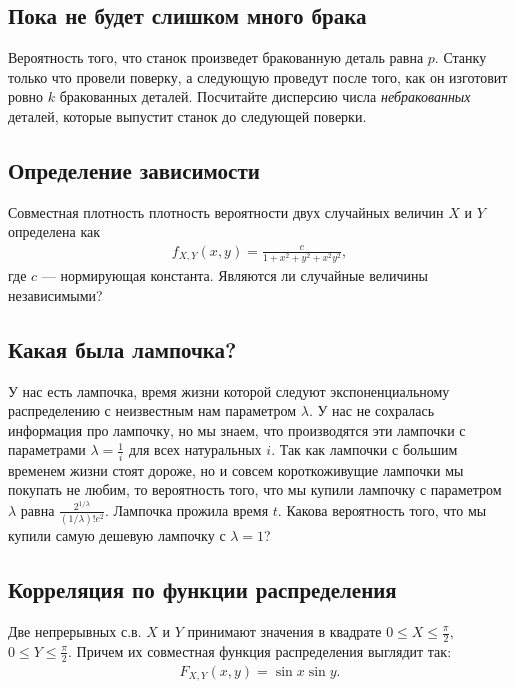 \documentclass[12pt]{article}
\begin{document}
\subsection{Пока не будет слишком много брака}

Вероятность того, что станок произведет бракованную деталь равна $p$. Станку только что провели поверку, а следующую проведут после того, как он изготовит ровно $k$ бракованных деталей. Посчитайте дисперсию числа \emph{небракованных} деталей, которые выпустит станок до следующей поверки.



\subsection{Определение зависимости}

Совместная плотность плотность вероятности двух случайных величин $X$ и $Y$ определена как
\begin{align*}
    f_{X, Y}(x, y) = \frac{c}{1 + x^2 + y^2 + x^2y^2},
\end{align*}
где $c$ --- нормирующая константа. Являются ли случайные величины независимыми?



\subsection{Какая была лампочка?}

У нас есть лампочка, время жизни которой следуют экспоненциальному распределению с неизвестным нам параметром $\lambda$. У нас не сохралась информация про лампочку, но мы знаем, что производятся эти лампочки с параметрами $\lambda = \frac{1}{i}$ для всех натуральных $i$. Так как лампочки с большим временем жизни стоят дороже, но и совсем короткоживущие лампочки мы покупать не любим, то вероятность того, что мы купили лампочку с параметром $\lambda$ равна $\frac{2^{1/\lambda}}{(1/\lambda)!e^2}$. Лампочка прожила время $t$. Какова вероятность того, что мы купили самую дешевую лампочку с $\lambda = 1$?




\subsection{Корреляция по функции распределения}

Две непрерывных с.в. $X$ и $Y$ принимают значения в квадрате $0 \le X \le \frac{\pi}{2},$ $0 \le Y \le \frac{\pi}{2}$. Причем их совместная функция распределения выглядит так:
\begin{align*}
    F_{X, Y} (x, y) = \sin x \sin y.
\end{align*}
\end{document}
